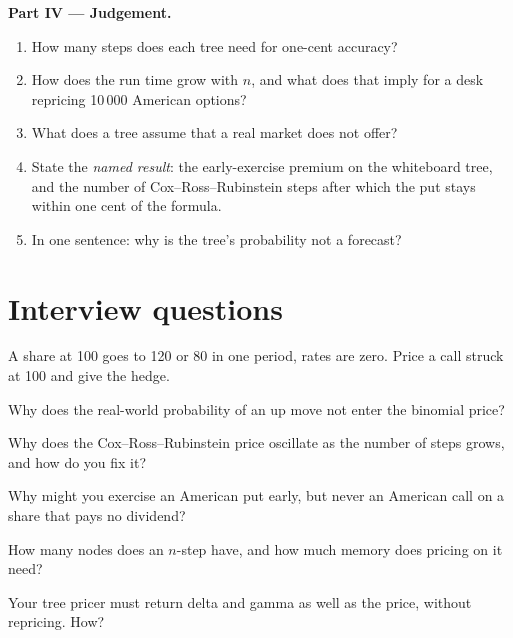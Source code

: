 \begin{problem}
\medskip\noindent\textbf{Part IV --- Judgement.}
\begin{enumerate}[resume]
\item How many steps does each tree need for one-cent accuracy?
\item How does the run time grow with $n$, and what does that imply for a desk
repricing 10\,000 American options?
\item What does a tree assume that a real market does not offer?
\item State the \emph{named result}: the early-exercise premium on the whiteboard
tree, and the number of Cox--Ross--Rubinstein steps after which the put stays
within one cent of the formula.
\item In one sentence: why is the tree's probability not a forecast?
\end{enumerate}
\end{problem}

\section{Interview questions}

\begin{interviewq}\label{iq:dv:the-binomial-model:1}
A share at 100 goes to 120 or 80 in one period, rates are zero. Price a call
struck at 100 and give the hedge.
\end{interviewq}

\begin{interviewq}\label{iq:dv:the-binomial-model:2}
Why does the real-world probability of an up move not enter the binomial price?
\end{interviewq}

\begin{interviewq}\label{iq:dv:the-binomial-model:3}
Why does the Cox--Ross--Rubinstein price oscillate as the number of steps grows,
and how do you fix it?
\end{interviewq}

\begin{interviewq}\label{iq:dv:the-binomial-model:4}
Why might you exercise an American put early, but never an American call on a
share that pays no dividend?
\end{interviewq}

\begin{interviewq}\label{iq:dv:the-binomial-model:5}
How many nodes does an $n$-step  have, and how much memory does
pricing on it need?
\end{interviewq}

\begin{interviewq}\label{iq:dv:the-binomial-model:6}
Your tree pricer must return delta and gamma as well as the price, without
repricing. How?
\end{interviewq}
